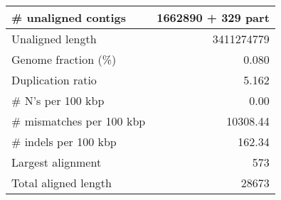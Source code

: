 \documentclass[12pt,a4paper]{article}
\begin{document}
\begin{table}[ht]
\begin{center}
\begin{tabular}{|l*{1}{|r}|}
\# unaligned contigs & 1662890 + 329 part \\ \hline
Unaligned length & 3411274779 \\ \hline
Genome fraction (\%) & 0.080 \\ \hline
Duplication ratio & 5.162 \\ \hline
\# N's per 100 kbp & 0.00 \\ \hline
\# mismatches per 100 kbp & 10308.44 \\ \hline
\# indels per 100 kbp & 162.34 \\ \hline
Largest alignment & 573 \\ \hline
Total aligned length & 28673 \\ \hline
\end{tabular}
\end{center}
\end{table}
\end{document}
